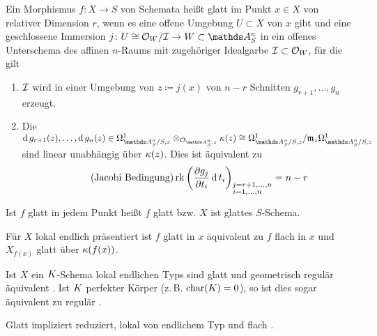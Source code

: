 \documentclass[german]{scrreprt}
\begin{document}
\begin{Definition}
  Ein Morphismus $f\colon X\to S$ von Schemata heißt glatt im Punkt
  $x\in X$ von relativer Dimension $r$, wenn es eine offene Umgebung
  $U\subset X$ von $x$ gibt und eine geschlossene Immersion $j\colon
  U\cong\O_W/\I\to W\subset\A_S^n$ in ein offenes Unterschema des affinen
  $n$-Raums mit zugehöriger Idealgarbe $\mathcal{I}\subset\mathcal{O}_W$, für die
  gilt
  \begin{enumerate}[label=(\alph*)]
  \item $\mathcal{I}$ wird in einer Umgebung von $z\coloneqq j(x)$ von $n-r$ Schnitten
    $g_{r+1},\dotsc,g_{n}$ erzeugt.
  \item Die $\d g_{r+1}(z),\dotsc,\d g_{n}(z)\in 
    \Om{\A_S^n/S,z} \otimes_{\O_{\A_S^n,z}} \k(z)
    \cong \Om{\A_S^n/S,z}/\m_z\Om{\A_S^n/S,z}$ 
    sind linear unabhängig über $\kappa(z)$.
    Dies ist äquivalent zu
    \begin{gather*}\tag{Jacobi Bedingung}
      \operatorname{rk}\left(
        \frac{\partial g_j}{\partial t_i}\operatorname{d} t_i 
      \right)_{\substack{j=r+1,\dotsc,n\\i=1,\dotsc,n\phantom{+1}}}
      = n-r
    \end{gather*}
  \end{enumerate}
  Ist $f$ glatt in jedem Punkt heißt $f$ glatt bzw. $X$ ist glattes
  $S$-Schema.  
  \cite[8.5, Definition 1]{bosch}

  Für $X$ lokal endlich präsentiert ist $f$ glatt in $x$ äquivalent zu
  $f$ flach in $x$ und $X_{f(x)}$ glatt über $\kappa(f(x))$.
  \cite[8.5, Proposition 17]{bosch}

  Ist $X$ ein $K$-Schema lokal endlichen Typs sind glatt und
  geometrisch regulär äquivalent
  \cite[Corollary 6.32]{wedhorn}.
  Ist $K$ perfekter Körper (z.\,B. $\operatorname{char}(K)=0$), so ist dies sogar
  äquivalent zu regulär
  \cite[Remark 6.33]{wedhorn}.

  \begin{Bemerkung}\label{thm:implikationenglatt}
    Glatt impliziert reduziert, lokal von endlichem Typ und flach
    \cite[für flach s.][Theorem 14.22]{wedhorn}.
  \end{Bemerkung}
\end{Definition}
\end{document}
